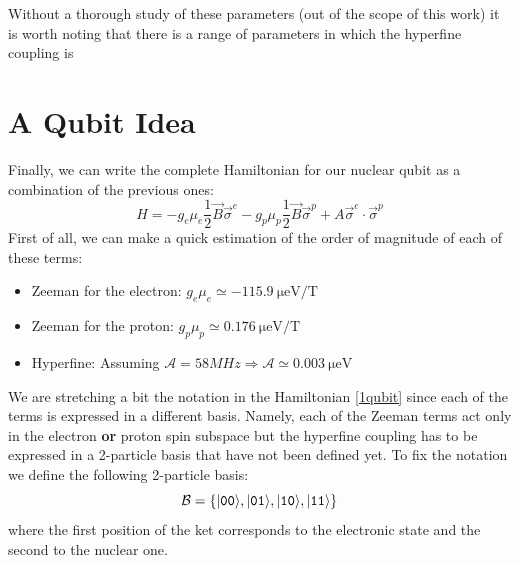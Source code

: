 Without a thorough study of these parameters (out of the scope of this work) it is worth noting that there is a range of parameters in which the hyperfine coupling is 




\newpage
\section{A Qubit Idea}


Finally, we can write the complete Hamiltonian for our nuclear qubit as a combination of the previous ones:
\begin{equation}
  H = -g_e\mu_e\frac{1}{2}\vec{B}\vec{\sigma}^e
      -g_p\mu_p\frac{1}{2}\vec{B}\vec{\sigma}^p
      +A\vec{\sigma}^e\cdot\vec{\sigma}^p
\label{1qubit}
\end{equation}
First of all, we can make a quick estimation of the order of magnitude of each of these terms:
\begin{itemize}
  \item Zeeman for the electron: $g_e\mu_e\simeq\SI{-115.9}{\micro\eV\per\tesla}$
  \item Zeeman for the proton: $g_p\mu_p\simeq\SI{0.176}{\micro\eV\per\tesla}$
  \item Hyperfine: Assuming
  $\mathcal{A}=58MHz\Rightarrow\mathcal{A}\simeq\SI{0.003}{\micro\eV}$
\end{itemize}
We are stretching a bit the notation in the Hamiltonian \eqref{1qubit} since each of the terms is expressed in a different basis. Namely, each of the Zeeman terms act only in the electron \textbf{or} proton spin subspace but the hyperfine coupling has to be expressed in a 2-particle basis that have not been defined yet.
To fix the notation we define the following 2-particle basis:
\begin{equation}
  \mathcal{B}=\left\{|\texttt{0}\texttt{0}\rangle,|\texttt{0}\texttt{1}\rangle,
                     |\texttt{1}\texttt{0}\rangle,|\texttt{1}\texttt{1}\rangle\right\}
\label{basis}
\end{equation}
where the first position of the ket corresponds to the electronic state and the second to the nuclear one.

